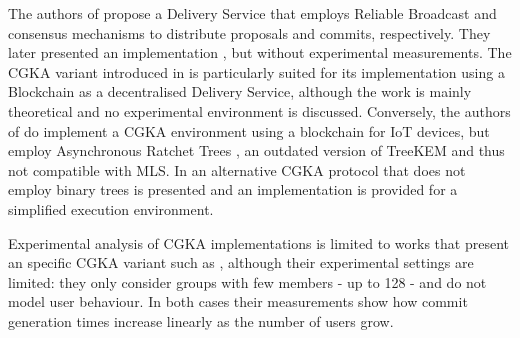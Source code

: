 The authors of \cite{discreet_original} propose a Delivery Service that employs Reliable Broadcast and consensus mechanisms to distribute proposals and commits, respectively. They later presented an implementation \cite{discreet}, but without experimental measurements. The CGKA variant introduced in \cite{decaf} is particularly suited for its implementation using a Blockchain as a decentralised Delivery Service, although the work is mainly theoretical and no experimental environment is discussed. Conversely, the authors of \cite{art_bc} do implement a CGKA environment using a blockchain for IoT devices, but employ Asynchronous Ratchet Trees \cite{art}, an outdated version of TreeKEM and thus not compatible with MLS. In \cite{dec_ack} an alternative CGKA protocol that does not employ binary trees is presented and an implementation is provided for a simplified execution environment. 

Experimental analysis of CGKA implementations is limited to works that present an specific CGKA variant such as \cite{a_cgka, dec_ack, treesync}, although their experimental settings are limited: they only consider groups with few members - up to 128 - and do not model user behaviour. In both cases their measurements show how commit generation times increase linearly as the number of users grow.